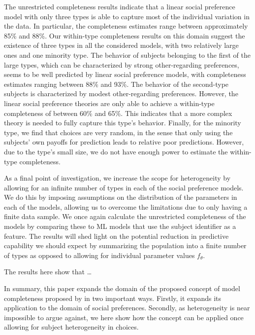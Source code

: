 \documentclass[letterpaper,11pt,leqno]{article}
\begin{document}
The unrestricted completeness results indicate that a linear social preference model with only three types is able to capture most of the individual variation in the data. In particular, the completeness estimates range between approximately 85\% and 88\%. Our within-type completeness results on this domain suggest the existence of three types in all the considered models, with two relatively large ones and one minority type. The behavior of subjects belonging to the first of the large types, which can be characterized by strong other-regarding preferences, seems to be well predicted by linear social preference models, with completeness estimates ranging between 88\% and 93\%. The behavior of the second-type subjects is characterized by modest other-regarding preferences. However, the linear social preference theories are only able to achieve a within-type completeness of between 60\% and 65\%. This indicates that a more complex theory is needed to fully capture this type's behavior. Finally, for the minority type, we find that choices are very random, in the sense that only using the subjects' own payoffs for prediction leads to relative poor predictions. However, due to the type's small size, we do not have enough power to estimate the within-type completeness.

As a final point of investigation, we increase the scope for heterogeneity by allowing for an infinite number of types in each of the social preference models. We do this by imposing assumptions on the distribution of the parameters in each of the models, allowing us to overcome the limitations due to only having a finite data sample. We once again calculate the unrestricted completeness of the models by comparing these to ML models that use the subject identifier as a feature. The results will shed light on the potential reduction in predictive capability we should expect by summarizing the population into a finite number of types as opposed to allowing for individual parameter values $f_\theta$.

The results here show that \dots

In summary, this paper expands the domain of the proposed concept of model completeness proposed by \citet{Fudenberg2022} in two important ways. Firstly, it expands its application to the domain of social preferences. Secondly, as heterogeneity is near impossible to argue against, we here show how the concept can be applied once allowing for subject heterogeneity in choices.
\end{document}
